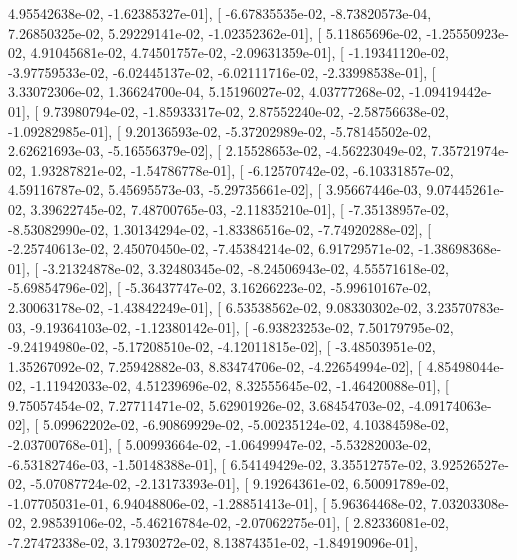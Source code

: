 \documentclass{article}
\begin{document}
          4.95542638e-02,  -1.62385327e-01],
       [ -6.67835535e-02,  -8.73820573e-04,   7.26850325e-02,
          5.29229141e-02,  -1.02352362e-01],
       [  5.11865696e-02,  -1.25550923e-02,   4.91045681e-02,
          4.74501757e-02,  -2.09631359e-01],
       [ -1.19341120e-02,  -3.97759533e-02,  -6.02445137e-02,
         -6.02111716e-02,  -2.33998538e-01],
       [  3.33072306e-02,   1.36624700e-04,   5.15196027e-02,
          4.03777268e-02,  -1.09419442e-01],
       [  9.73980794e-02,  -1.85933317e-02,   2.87552240e-02,
         -2.58756638e-02,  -1.09282985e-01],
       [  9.20136593e-02,  -5.37202989e-02,  -5.78145502e-02,
          2.62621693e-03,  -5.16556379e-02],
       [  2.15528653e-02,  -4.56223049e-02,   7.35721974e-02,
          1.93287821e-02,  -1.54786778e-01],
       [ -6.12570742e-02,  -6.10331857e-02,   4.59116787e-02,
          5.45695573e-03,  -5.29735661e-02],
       [  3.95667446e-03,   9.07445261e-02,   3.39622745e-02,
          7.48700765e-03,  -2.11835210e-01],
       [ -7.35138957e-02,  -8.53082990e-02,   1.30134294e-02,
         -1.83386516e-02,  -7.74920288e-02],
       [ -2.25740613e-02,   2.45070450e-02,  -7.45384214e-02,
          6.91729571e-02,  -1.38698368e-01],
       [ -3.21324878e-02,   3.32480345e-02,  -8.24506943e-02,
          4.55571618e-02,  -5.69854796e-02],
       [ -5.36437747e-02,   3.16266223e-02,  -5.99610167e-02,
          2.30063178e-02,  -1.43842249e-01],
       [  6.53538562e-02,   9.08330302e-02,   3.23570783e-03,
         -9.19364103e-02,  -1.12380142e-01],
       [ -6.93823253e-02,   7.50179795e-02,  -9.24194980e-02,
         -5.17208510e-02,  -4.12011815e-02],
       [ -3.48503951e-02,   1.35267092e-02,   7.25942882e-03,
          8.83474706e-02,  -4.22654994e-02],
       [  4.85498044e-02,  -1.11942033e-02,   4.51239696e-02,
          8.32555645e-02,  -1.46420088e-01],
       [  9.75057454e-02,   7.27711471e-02,   5.62901926e-02,
          3.68454703e-02,  -4.09174063e-02],
       [  5.09962202e-02,  -6.90869929e-02,  -5.00235124e-02,
          4.10384598e-02,  -2.03700768e-01],
       [  5.00993664e-02,  -1.06499947e-02,  -5.53282003e-02,
         -6.53182746e-03,  -1.50148388e-01],
       [  6.54149429e-02,   3.35512757e-02,   3.92526527e-02,
         -5.07087724e-02,  -2.13173393e-01],
       [  9.19264361e-02,   6.50091789e-02,  -1.07705031e-01,
          6.94048806e-02,  -1.28851413e-01],
       [  5.96364468e-02,   7.03203308e-02,   2.98539106e-02,
         -5.46216784e-02,  -2.07062275e-01],
       [  2.82336081e-02,  -7.27472338e-02,   3.17930272e-02,
          8.13874351e-02,  -1.84919096e-01],
\end{document}
